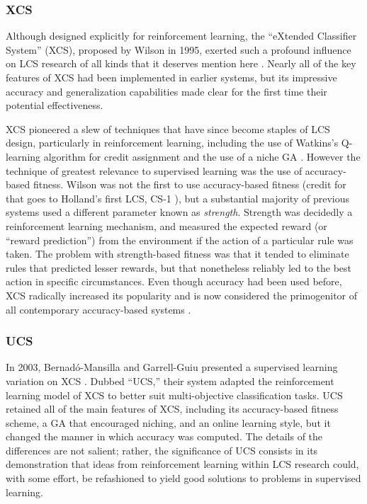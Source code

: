\documentclass[11pt]{article}
\begin{document}
\subsubsection{XCS}

Although designed explicitly for reinforcement learning, the ``eXtended Classifier System'' (XCS), proposed by Wilson in 1995, exerted such a profound influence on LCS research of all kinds that it deserves mention here \cite{wilson_classifier_1995}. Nearly all of the key features of XCS had been implemented in earlier systems, but its impressive accuracy and generalization capabilities made clear for the first time their potential effectiveness.

XCS pioneered a slew of techniques that have since become staples of LCS design, particularly in reinforcement learning, including the use of Watkins's Q-learning algorithm for credit assignment and the use of a niche GA \cite{urbanowicz_learning_2009}. However the technique of greatest relevance to supervised learning was the use of accuracy-based fitness. Wilson was not the first to use accuracy-based fitness (credit for that goes to Holland's first LCS, CS-1 \cite{holland_cognitive_1977}), but a substantial majority of previous systems used a different parameter known as \emph{strength}. Strength was decidedly a reinforcement learning mechanism, and measured the expected reward (or ``reward prediction'') from the environment if the action of a particular rule was taken. The problem with strength-based fitness was that it tended to eliminate rules that predicted lesser rewards, but that nonetheless reliably led to the best action in specific circumstances. Even though accuracy had been used before, XCS radically increased its popularity and is now considered the primogenitor of all contemporary accuracy-based systems \cite{urbanowicz_learning_2009}.

\subsubsection{UCS}

In 2003, Bernad\'o-Mansilla and Garrell-Guiu presented a supervised learning variation on XCS \cite{bernado-mansilla_accuracy-based_2003}. Dubbed ``UCS,'' their system adapted the reinforcement learning model of XCS to better suit multi-objective classification tasks. UCS retained all of the main features of XCS, including its accuracy-based fitness scheme, a GA that encouraged niching, and an online learning style, but it changed the manner in which accuracy was computed. The details of the differences are not salient; rather, the significance of UCS consists in its demonstration that ideas from reinforcement learning within LCS research could, with some effort, be refashioned to yield good solutions to problems in supervised learning.
\end{document}

